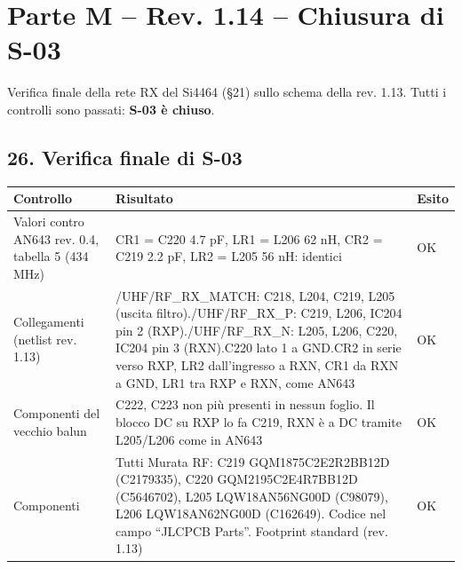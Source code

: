 \clearpage
\section[Parte M – Rev. 1.14 – Chiusura di S-03]{Parte M – Rev. 1.14 – Chiusura di S-03}

Verifica finale della rete RX del Si4464 (§21) sullo schema della rev. 1.13. Tutti i controlli sono passati: \textbf{S-03 è chiuso}.

\subsection[26. Verifica finale di S-03]{26. Verifica finale di S-03 }

{\small{}\setlength{\tabcolsep}{4pt}\renewcommand{\arraystretch}{1.1}
\begin{longtable}{>{\raggedright\arraybackslash}p{}>{\raggedright\arraybackslash}p{}>{\raggedright\arraybackslash}p{}}
\toprule
\textbf{Controllo} & \textbf{Risultato} & \textbf{Esito} \\
\midrule
\endhead
\bottomrule\endfoot
Valori contro AN643 rev. 0.4, tabella 5 (434 MHz) & CR1 = C220 4.7 pF, LR1 = L206 62 nH, CR2 = C219 2.2 pF, LR2 = L205 56 nH: identici & OK \\\midrule[0.15pt]
Collegamenti (netlist rev. 1.13) & /\allowbreak{}UHF/\allowbreak{}RF\_\allowbreak{}RX\_\allowbreak{}MATCH: C218, L204, C219, L205 (uscita filtro).\newline{}/\allowbreak{}UHF/\allowbreak{}RF\_\allowbreak{}RX\_\allowbreak{}P: C219, L206, IC204 pin 2 (RXP).\newline{}/\allowbreak{}UHF/\allowbreak{}RF\_\allowbreak{}RX\_\allowbreak{}N: L205, L206, C220, IC204 pin 3 (RXN).\newline{}C220 lato 1 a GND.\newline{}CR2 in serie verso RXP, LR2 dall'ingresso a RXN, CR1 da RXN a GND, LR1 tra RXP e RXN, come AN643 & OK \\\midrule[0.15pt]
Componenti del vecchio balun & C222, C223 non più presenti in nessun foglio. Il blocco DC su RXP lo fa C219, RXN è a DC tramite L205/\allowbreak{}L206 come in AN643 & OK \\\midrule[0.15pt]
Componenti & Tutti Murata RF: C219 GQM1875C2E2R2BB12D (C2179335), C220 GQM2195C2E4R7BB12D (C5646702), L205 LQW18AN56NG00D (C98079), L206 LQW18AN62NG00D (C162649). Codice nel campo \textquotedblleft{}JLCPCB Parts\textquotedblright{}. Footprint standard (rev. 1.13) & OK \\\midrule[0.15pt]

\end{longtable}}
